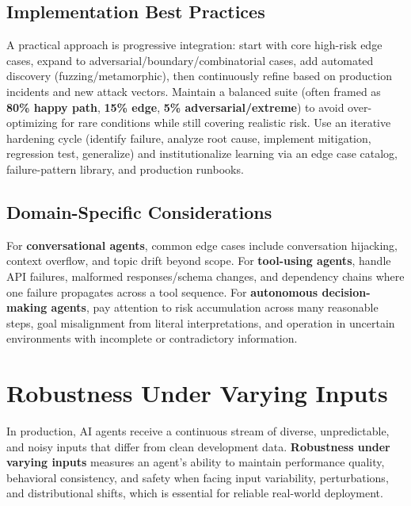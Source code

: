 \begin{TNtwocol}
\subsection*{Implementation Best Practices}
A practical approach is progressive integration: start with core high-risk edge cases, expand to adversarial/boundary/combinatorial cases, add automated discovery (fuzzing/metamorphic), then continuously refine based on production incidents and new attack vectors. Maintain a balanced suite (often framed as \textbf{80\% happy path}, \textbf{15\% edge}, \textbf{5\% adversarial/extreme}) to avoid over-optimizing for rare conditions while still covering realistic risk. Use an iterative hardening cycle (identify failure, analyze root cause, implement mitigation, regression test, generalize) and institutionalize learning via an edge case catalog, failure-pattern library, and production runbooks.

\subsection*{Domain-Specific Considerations}
For \textbf{conversational agents}, common edge cases include conversation hijacking, context overflow, and topic drift beyond scope. For \textbf{tool-using agents}, handle API failures, malformed responses/schema changes, and dependency chains where one failure propagates across a tool sequence. For \textbf{autonomous decision-making agents}, pay attention to risk accumulation across many reasonable steps, goal misalignment from literal interpretations, and operation in uncertain environments with incomplete or contradictory information.

\section{Robustness Under Varying Inputs}
\label{sec:robustness-varying-inputs}

In production, AI agents receive a continuous stream of diverse, unpredictable, and noisy inputs that differ from clean development data. \textbf{Robustness under varying inputs} measures an agent's ability to maintain performance quality, behavioral consistency, and safety when facing input variability, perturbations, and distributional shifts, which is essential for reliable real-world deployment.


\end{TNtwocol}
